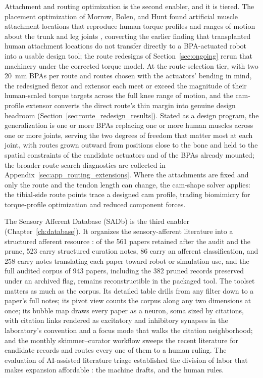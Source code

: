 Attachment and routing optimization is the second enabler, and it is tiered. The placement optimization of Morrow, Bolen, and Hunt found artificial muscle attachment locations that reproduce human torque profiles and ranges of motion about the trunk and leg joints \citep{morrow_optimization_2020}, converting the earlier finding that transplanted human attachment locations do not transfer directly to a BPA-actuated robot \citep{bolen_bipedal_2019, bolen_determination_2019} into a usable design tool; the route redesigns of Section~\ref{sec:ongoing} rerun that machinery under the corrected torque model. At the route-selection tier, with two \qty{20}{\mm} BPAs per route and routes chosen with the actuators' bending in mind, the redesigned flexor and extensor each meet or exceed the magnitude of their human-scaled torque targets across the full knee range of motion, and the cam-profile extensor converts the direct route's thin margin into genuine design headroom (Section~\ref{sec:route_redesign_results}). Stated as a design program, the generalization is one or more BPAs replacing one or more human muscles across one or more joints, serving the two degrees of freedom that matter most at each joint, with routes grown outward from positions close to the bone and held to the spatial constraints of the candidate actuators and of the BPAs already mounted; the broader route-search diagnostics are collected in Appendix~\ref{sec:app_routing_extensions}. Where the attachments are fixed and only the route and the tendon length can change, the cam-shape solver applies: the tibial-side route points trace a designed cam profile, trading biomimicry for torque-profile optimization and reduced component forces.

The Sensory Afferent Database (SADb) is the third enabler (Chapter~\ref{ch:database}). It organizes the sensory-afferent literature into a structured afferent resource \citep{bolen_sensory_2023}: of the 561 papers retained after the audit and the prune, 523 carry structured curation notes, 86 carry an afferent classification, and 258 carry notes translating each paper toward robot or simulation use, and the full audited corpus of 943 papers, including the 382 pruned records preserved under an archived flag, remains reconstructible in the packaged tool. The toolset matters as much as the corpus. Its detailed table drills from any filter down to a paper's full notes; its pivot view counts the corpus along any two dimensions at once; its bubble map draws every paper as a neuron, soma sized by citations, with citation links rendered as excitatory and inhibitory synapses in the laboratory's convention and a focus mode that walks the citation neighborhood; and the monthly skimmer--curator workflow sweeps the recent literature for candidate records and routes every one of them to a human ruling. The evaluation of AI-assisted literature triage established the division of labor that makes expansion affordable \citep{bolen_using_2024}: the machine drafts, and the human rules.

